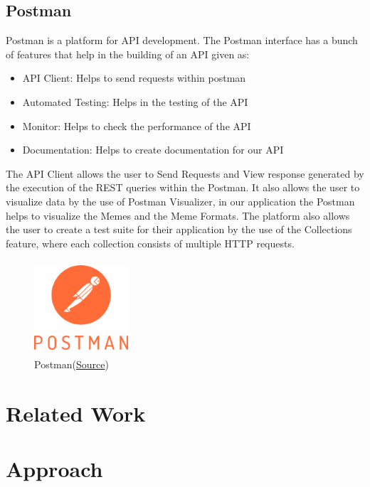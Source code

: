 \documentclass[12pt]{article}
\begin{document}
\subsection{Postman}
Postman is a platform for \ac{API} development. The Postman interface has a bunch of features that help in the building of an \ac{API} given as:
\begin{itemize}
    \item API Client: Helps to send requests within postman
    \item Automated Testing: Helps in the testing of the API
    \item Monitor: Helps to check the performance of the API
    \item Documentation: Helps to create documentation for our API
\end{itemize}
\begin{flushleft}
The \ac{API} Client allows the user to Send Requests and View response generated by the execution of the REST queries within the Postman. It also allows the user to visualize data by the use of Postman Visualizer, in our application the Postman helps to visualize the Memes and the Meme Formats. The platform also allows the user to create a test suite for their application by the use of the Collections feature, where each collection consists of multiple HTTP requests.
\end{flushleft}
\begin{figure}[H]
    \centering
    \includegraphics[width=3.5cm, height=3.5cm]{../report_MemeEcon/images/postman.png}
    \caption{Postman(\href{https://www.postman.com/resources/media-assets/}{Source})}
    \label{fig:Postman}
\end{figure}

\section{Related Work} %

\section{Approach} \label{sec:Approach}
\end{document}
